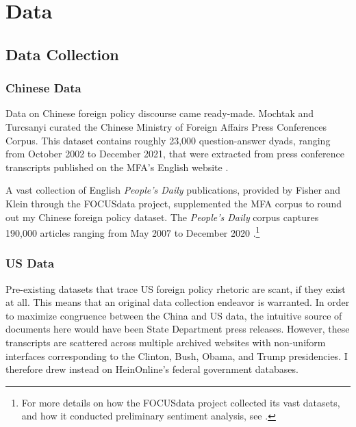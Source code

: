 \documentclass[12pt,letterpaper]{article}
\begin{document}
\section{Data}
\label{sec:data}

\subsection{Data Collection}

\subsubsection*{Chinese Data}

Data on Chinese foreign policy discourse came ready-made. Mochtak and Turcsanyi curated the Chinese Ministry of Foreign Affairs Press Conferences Corpus. This dataset contains roughly 23,000 question-answer dyads, ranging from October 2002 to December 2021, that were extracted from press conference transcripts published on the MFA's English website \autocite{mochtak2022data}.

A vast collection of English \emph{People's Daily} publications, provided by Fisher and Klein through the FOCUSdata project, supplemented the MFA corpus to round out my Chinese foreign policy dataset. The \emph{People's Daily} corpus captures 190,000 articles ranging from May 2007 to December 2020 \autocite{fisher2022data}.\footnote{For more details on how the FOCUSdata project collected its vast datasets, and how it conducted preliminary sentiment analysis, see \textcite{fisher2022focus}.}

\subsubsection*{US Data}

Pre-existing datasets that trace US foreign policy rhetoric are scant, if they exist at all. This means that an original data collection endeavor is warranted. In order to maximize congruence between the China and US data, the intuitive source of documents here would have been State Department press releases. However, these transcripts are scattered across multiple archived websites with non-uniform interfaces corresponding to the Clinton, Bush, Obama, and Trump presidencies. I therefore drew instead on HeinOnline's federal government databases.
\end{document}
